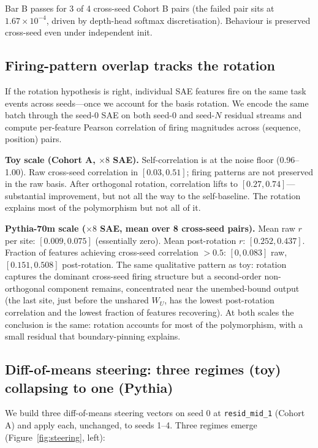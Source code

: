 \documentclass[11pt,letterpaper]{article}
\begin{document}
Bar B passes for 3 of 4 cross-seed Cohort B pairs (the failed pair sits at $1.67 \times 10^{-4}$, driven by depth-head softmax discretisation). Behaviour is preserved cross-seed even under independent init.

\subsection{Firing-pattern overlap tracks the rotation}

If the rotation hypothesis is right, individual SAE features fire on the same task events across seeds---once we account for the basis rotation. We encode the same batch through the seed-0 SAE on both seed-0 and seed-$N$ residual streams and compute per-feature Pearson correlation of firing magnitudes across (sequence, position) pairs.

\textbf{Toy scale (Cohort A, $\times 8$ SAE).} Self-correlation is at the noise floor (0.96--1.00). Raw cross-seed correlation in $[0.03, 0.51]$; firing patterns are not preserved in the raw basis. After orthogonal rotation, correlation lifts to $[0.27, 0.74]$---substantial improvement, but not all the way to the self-baseline. The rotation explains most of the polymorphism but not all of it.

\textbf{Pythia-70m scale ($\times 8$ SAE, mean over 8 cross-seed pairs).} Mean raw $r$ per site: $[0.009, 0.075]$ (essentially zero). Mean post-rotation $r$: $[0.252, 0.437]$. Fraction of features achieving cross-seed correlation $> 0.5$: $[0, 0.083]$ raw, $[0.151, 0.508]$ post-rotation. The same qualitative pattern as toy: rotation captures the dominant cross-seed firing structure but a second-order non-orthogonal component remains, concentrated near the unembed-bound output (the last site, just before the unshared $W_U$, has the lowest post-rotation correlation and the lowest fraction of features recovering). At both scales the conclusion is the same: rotation accounts for most of the polymorphism, with a small residual that boundary-pinning explains.

\subsection{Diff-of-means steering: three regimes (toy) collapsing to one (Pythia)}

We build three diff-of-means steering vectors on seed 0 at \texttt{resid\_mid\_1} (Cohort A) and apply each, unchanged, to seeds 1--4. Three regimes emerge (Figure~\ref{fig:steering}, left):
\end{document}
